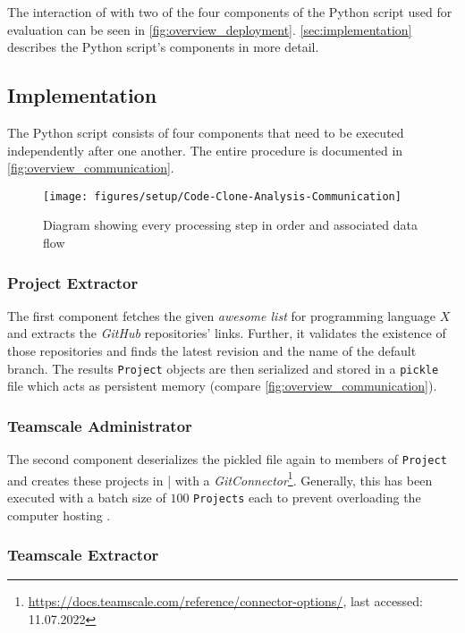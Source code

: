 The interaction of \teamscale{} with two of the four components of the Python script used for evaluation can be seen in \autoref{fig:overview_deployment}. \autoref{sec:implementation} describes the Python script's components in more detail.

\subsection{Implementation}
\label{sec:implementation}

The Python script\gitFootnote{} consists of four components that need to be executed independently after one another. The entire procedure is documented in \autoref{fig:overview_communication}.

\begin{figure}[tbh]
	\centering
	\texttt{[image: figures/setup/Code-Clone-Analysis-Communication]}
	\caption{Diagram showing every processing step in order and associated data flow}
	\label{fig:overview_communication}
\end{figure}

\subsubsection{Project Extractor}

The first component fetches the given \textit{awesome list} for programming language $X$ and extracts the \textit{GitHub} repositories’ links. Further, it validates the existence of those repositories and finds the latest revision and the name of the default branch. The results \texttt{Project} objects are then serialized and stored in a \texttt{pickle} file which acts as persistent memory (compare \autoref{fig:overview_communication}).

\subsubsection{Teamscale Administrator}

The second component deserializes the pickled file again to members of \texttt{Project} and creates these projects in \teamscale|{} with a \textit{GitConnector}\footnote{\url{https://docs.teamscale.com/reference/connector-options/}, last accessed: 11.07.2022}. Generally, this has been executed with a batch size of $100$ \texttt{Projects} each to prevent overloading the computer hosting \teamscale{}.

\subsubsection{Teamscale Extractor}

